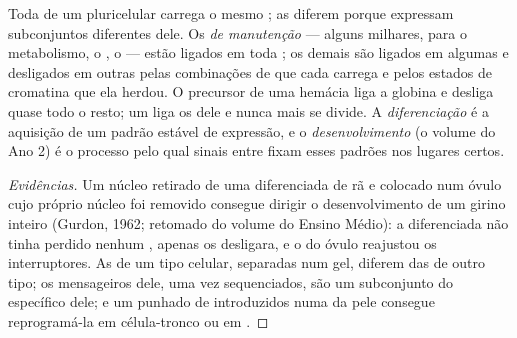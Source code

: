\begin{proposition}\label{prop:b1:expression-control:differentiation}
Toda  de um  pluricelular carrega o mesmo ; as
 diferem porque expressam subconjuntos diferentes dele. Os 
\emph{de manutenção} --- alguns milhares, para o metabolismo, o
, o  --- estão ligados em toda ; os demais
são ligados em algumas  e desligados em outras pelas combinações
de  que cada  carrega e pelos estados de
cromatina que ela herdou. O precursor de uma hemácia liga a globina e
desliga quase todo o resto; um  liga os  dele e nunca mais
se divide. A \emph{diferenciação} é a aquisição de um padrão estável de
expressão, e o \emph{desenvolvimento} (o volume do Ano 2) é o processo
pelo qual sinais entre  fixam esses padrões nos lugares certos.
\end{proposition}
\begin{proof}[Evidências]
Um núcleo retirado de uma  diferenciada de rã e colocado num óvulo
cujo próprio núcleo foi removido consegue dirigir o desenvolvimento de
um girino inteiro (Gurdon, 1962; retomado do volume do Ensino Médio): a
 diferenciada não tinha perdido nenhum , apenas os desligara,
e o  do óvulo reajustou os interruptores. As  de um
tipo celular, separadas num gel, diferem das de outro tipo; os
mensageiros dele, uma vez sequenciados, são um subconjunto do 
específico dele; e um punhado de  introduzidos
numa  da pele consegue reprogramá-la em célula-tronco ou em
.
\end{proof}

